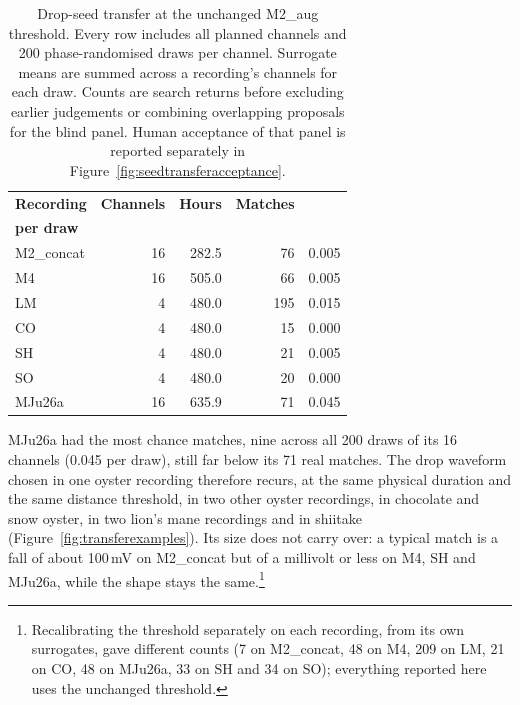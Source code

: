 \begin{table}[htbp]
\centering
\caption[{Drop-seed transfer at the unchanged M2\_aug threshold.}]{Drop-seed transfer at the unchanged M2\_aug threshold. Every row includes all planned channels and 200 phase-randomised draws per channel. Surrogate means are summed across a recording's channels for each draw. Counts are search returns before excluding earlier judgements or combining overlapping proposals for the blind panel. Human acceptance of that panel is reported separately in Figure~\ref{fig:seedtransferacceptance}.}
\label{tab:seedtransfer}
\small
\begin{tabularx}{\textwidth}{@{}Xrrrr@{}}
\toprule
\textbf{Recording} & \textbf{Channels} & \textbf{Hours} & \textbf{Matches} & \makecell[r]{\textbf{Surrogate mean}\\\textbf{per draw}}\\
\midrule
M2\_concat & 16 & 282.5 & 76 & 0.005\\
M4 & 16 & 505.0 & 66 & 0.005\\
LM & 4 & 480.0 & 195 & 0.015\\
CO & 4 & 480.0 & 15 & 0.000\\
SH & 4 & 480.0 & 21 & 0.005\\
SO & 4 & 480.0 & 20 & 0.000\\
MJu26a & 16 & 635.9 & 71 & 0.045\\
\bottomrule
\end{tabularx}
\end{table}

MJu26a had the most chance matches, nine across all 200 draws of its 16 channels (0.045 per draw), still far below its 71 real matches. The drop waveform chosen in one oyster recording therefore recurs, at the same physical duration and the same distance threshold, in two other oyster recordings, in chocolate and snow oyster, in two lion's mane recordings and in shiitake (Figure~\ref{fig:transferexamples}). Its size does not carry over: a typical match is a fall of about 100\,mV on M2\_concat but of a millivolt or less on M4, SH and MJu26a, while the shape stays the same.\footnote{Recalibrating the threshold separately on each recording, from its own surrogates, gave different counts (7 on M2\_concat, 48 on M4, 209 on LM, 21 on CO, 48 on MJu26a, 33 on SH and 34 on SO); everything reported here uses the unchanged threshold.}

